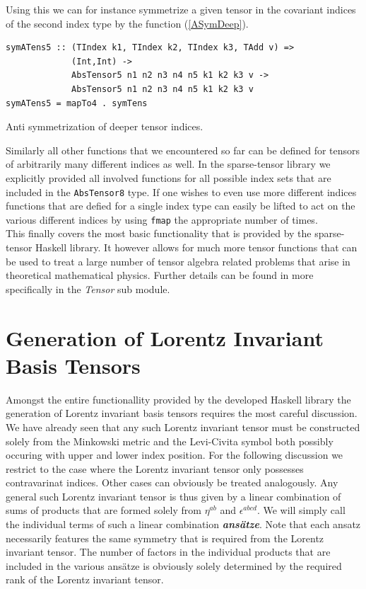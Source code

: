 \documentclass[a4paper,12pt, DIV=14, BCOR=5mm, twoside, headsepline, numbers=noenddot]{scrbook}
\begin{document}
Using this we can for instance symmetrize a given tensor in the covariant indices of the second index type by the function (\ref{ASymDeep}).

\begin{listing}[hbt!]
\begin{verbatim}
symATens5 :: (TIndex k1, TIndex k2, TIndex k3, TAdd v) =>
             (Int,Int) ->
             AbsTensor5 n1 n2 n3 n4 n5 k1 k2 k3 v ->
             AbsTensor5 n1 n2 n3 n4 n5 k1 k2 k3 v
symATens5 = mapTo4 . symTens
\end{verbatim} 
\caption{Anti symmetrization of deeper tensor indices. }\label{ASymDeep}
\end{listing}

Similarly all other functions that we encountered so far can be defined for tensors of arbitrarily many different indices as well. In the sparse-tensor library we explicitly provided all involved functions for all possible index sets that are included in the \texttt{AbsTensor8} type. If one wishes to even use more different indices functions that are defied for a single index type can easily be lifted to act on the various different indices by using \texttt{fmap} the appropriate number of times. \\

This finally covers the most basic functionality that is provided by the sparse-tensor Haskell library. It however allows for much more tensor functions that can be used to treat a large number of tensor algebra related problems that arise in theoretical mathematical physics. 
Further details can be found in \cite{sparse-tensor} more specifically in the \textit{Tensor} sub module.
\section{Generation of Lorentz Invariant Basis Tensors}\label{LorentzGen}
Amongst the entire functionallity provided by the developed Haskell library the generation of Lorentz invariant basis tensors requires the most careful discussion. We have already seen that any such Lorentz invariant tensor must be constructed solely from the Minkowski metric and the Levi-Civita symbol both possibly occuring with upper and lower index position. For the following discussion we restrict to the case where the Lorentz invariant tensor only possesses contravarinat indices. Other cases can obviously be treated analogously. Any general such Lorentz invariant tensor is thus given by a linear combination of sums of products that are formed solely from $\eta^{ab}$ and $\epsilon^{abcd}$.
We will simply call the individual terms of such a linear combination \textit{\textbf{ansätze}}. Note that each ansatz necessarily features the same symmetry that is required from the Lorentz invariant tensor. The number of factors in the individual products that are included in the various ansätze is obviously solely determined by the required rank of the Lorentz invariant tensor.
\end{document}

